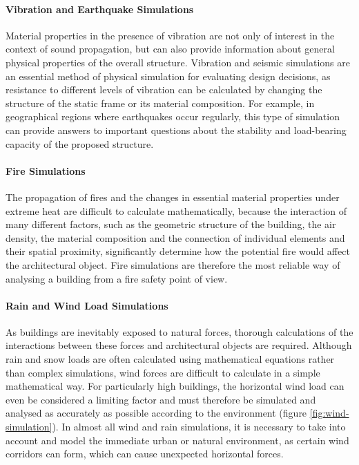 \documentclass[a4paper, 12pt]{report}
\begin{document}
\paragraph{Vibration and Earthquake Simulations}\label{par:vibration-and-earthquake-simulations}

Material properties in the presence of vibration are not only of interest in the context of sound propagation, but can also provide information about general physical properties of the overall structure. Vibration and seismic simulations are an essential method of physical simulation for evaluating design decisions, as resistance to different levels of vibration can be calculated by changing the structure of the static frame or its material composition. For example, in geographical regions where earthquakes occur regularly, this type of simulation can provide answers to important questions about the stability and load-bearing capacity of the proposed structure.

\paragraph{Fire Simulations}\label{par:fire-simulations}

The propagation of fires and the changes in essential material properties under extreme heat are difficult to calculate mathematically, because the interaction of many different factors, such as the geometric structure of the building, the air density, the material composition and the connection of individual elements and their spatial proximity, significantly determine how the potential fire would affect the architectural object. Fire simulations are therefore the most reliable way of analysing a building from a fire safety point of view.

\paragraph{Rain and Wind Load Simulations}\label{par:rain-and-wind-load-simulations}

As buildings are inevitably exposed to natural forces, thorough calculations of the interactions between these forces and architectural objects are required. Although rain and snow loads are often calculated using mathematical equations rather than complex simulations, wind forces are difficult to calculate in a simple mathematical way. For particularly high buildings, the horizontal wind load can even be considered a limiting factor and must therefore be simulated and analysed as accurately as possible according to the environment (figure \ref{fig:wind-simulation}). In almost all wind and rain simulations, it is necessary to take into account and model the immediate urban or natural environment, as certain wind corridors can form, which can cause unexpected horizontal forces.
\end{document}
